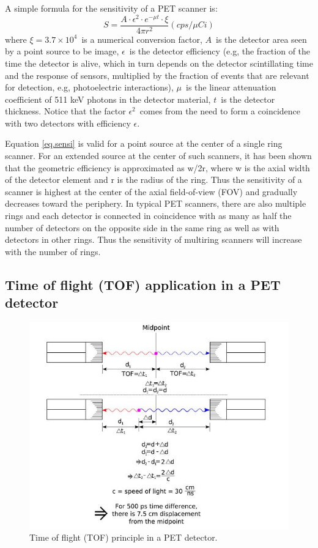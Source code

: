 A simple formula for the sensitivity of a PET scanner is:
\begin{equation}
S = \frac{A \cdot \epsilon^2 \cdot e^{-\mu t} \cdot \xi}{4 \pi r^2} (cps/\mu Ci)
\label{eq.sensi}
\end{equation}
%
where $\xi = 3.7 \times 10^4$~is a numerical conversion factor, $A$~is the detector area seen by a point source to be image, $\epsilon$~is the detector efficiency (e.g, the fraction of the time the detector is alive, which in turn depends on the detector scintillating time and the response of sensors, multiplied by the fraction of events that are relevant for detection, e.g, photoelectric interactions), $\mu$~is the linear attenuation coefficient of 511 keV photons in the detector material, $t$~is the detector thickness. Notice that the factor $\epsilon^2$~comes from the need to form a coincidence with two detectors with efficiency $\epsilon$.

Equation \ref{eq.sensi} is valid for a point source at the center of a single ring scanner. For an extended source at the center of such scanners, it has been shown that the geometric efficiency is approximated as w/2r, where w is the axial width of the detector element and r is the radius of the ring. Thus the sensitivity of a scanner is highest at the center of the axial field-of-view (FOV) and gradually decreases toward the periphery. In typical PET scanners, there are also multiple rings and each detector is connected in coincidence with as many as half the number of detectors on the opposite side in the same ring as well as with detectors in other rings. Thus the sensitivity of multiring scanners will increase with the number of rings.


\subsection{Time of flight (TOF) application in a PET detector}

\begin{figure}[!bthp]
	\centering
	\includegraphics[scale=1.0]{img/MAPD_tofprinciple.jpg}
	\caption{\label{fig.tof} Time of flight (TOF) principle in a PET detector.}
\end{figure}

